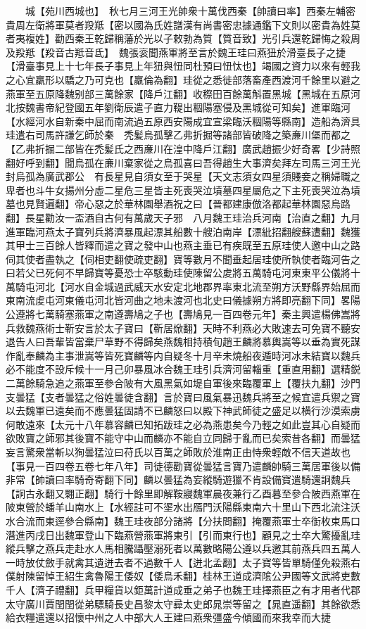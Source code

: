 　　城【苑川西城也】　秋七月三河王光帥衆十萬伐西秦【帥讀曰率】西秦左輔密貴周左衛將軍莫者羖羝【密以國為氏姓譜漢有尚書密忠據通鑑下文則以密貴為姓莫者夷複姓】勸西秦王乾歸稱藩於光以子敕勃為質【質音致】光引兵還乾歸悔之殺周及羖羝【羖音古羝音氐】　魏張衮聞燕軍將至言於魏王珪曰燕狃於滑臺長子之捷【滑臺事見上十七年長子事見上年狃與忸同杜預曰忸忲也】竭國之資力以來有輕我之心宜羸形以驕之乃可克也【羸倫為翻】珪從之悉徙部落畜產西渡河千餘里以避之燕軍至五原降魏别部三萬餘家【降戶江翻】收穄田百餘萬斛置黑城【黑城在五原河北按魏書帝紀登國五年劉衛辰遣子直力鞮出稒陽塞侵及黑城從可知矣】進軍臨河【水經河水自新秦中屈而南流過五原西安陽成宜宣梁臨沃稒陽等縣南】造船為濟具珪遣右司馬許謙乞師於秦　秃髪烏孤擊乙弗折掘等諸部皆破降之築亷川堡而都之【乙弗折掘二部皆在禿髪氏之西亷川在湟中降戶江翻】廣武趙振少好奇畧【少詩照翻好呼到翻】聞烏孤在亷川棄家從之烏孤喜曰吾得趙生大事濟矣拜左司馬三河王光封烏孤為廣武郡公　有長星見自須女至于哭星【天文志須女四星須賤妾之稱婦職之卑者也斗牛女揚州分虛二星危三星皆主死喪哭泣墳墓四星屬危之下主死喪哭泣為墳墓也見賢遍翻】帝心惡之於華林園舉酒祝之曰【晉都建康倣洛都起華林園惡烏路翻】長星勸汝一盃酒自古何有萬歲天子邪　八月魏王珪治兵河南【治直之翻】九月進軍臨河燕太子寶列兵將濟暴風起漂其船數十艘泊南岸【漂紕招翻艘蘇遭翻】魏獲其甲士三百餘人皆釋而遣之寶之發中山也燕主垂已有疾既至五原珪使人邀中山之路伺其使者盡執之【伺相吏翻使疏吏翻】寶等數月不聞垂起居珪使所執使者臨河告之曰若父已死何不早歸寶等憂恐士卒駭動珪使陳留公䖍將五萬騎屯河東東平公儀將十萬騎屯河北【河水自金城過武威天水安定北地郡界率東北流至朔方沃野縣界始屈而東南流䖍屯河東儀屯河北皆河曲之地未渡河也北史曰儀據朔方將即亮翻下同】畧陽公遵將七萬騎塞燕軍之南遵壽鳩之子也【壽鳩見一百四卷元年】秦主興遣楊佛嵩將兵救魏燕術士靳安言於太子寶曰【靳居焮翻】天時不利燕必大敗速去可免寶不聽安退告人曰吾輩皆當棄尸草野不得歸矣燕魏相持積旬趙王麟將慕輿嵩等以垂為實死謀作亂奉麟為主事泄嵩等皆死寶麟等内自疑冬十月辛未燒船夜遁時河冰未結寶以魏兵必不能度不設斥候十一月己卯暴風冰合魏王珪引兵濟河留輜重【重直用翻】選精鋭二萬餘騎急追之燕軍至參合陂有大風黑氣如堤自軍後來臨覆軍上【覆扶九翻】沙門支曇猛【支者曇猛之俗姓曇徒含翻】言於寶曰風氣暴迅魏兵將至之候宜遣兵禦之寶以去魏軍已遠矣而不應曇猛固請不已麟怒曰以殿下神武師徒之盛足以横行沙漠索虜何敢遠來【太元十八年慕容麟已知拓跋珪之必為燕患矣今乃輕之如此豈其心自疑而欲敗寶之師邪其後寶不能守中山而麟亦不能自立同歸于亂而已矣索昔各翻】而曇猛妄言驚衆當斬以狥曇猛泣曰苻氏以百萬之師敗於淮南正由恃衆輕敵不信天道故也【事見一百四卷五卷七年八年】司徒德勸寶從曇猛言寶乃遣麟帥騎三萬居軍後以備非常【帥讀曰率騎奇寄翻下同】麟以曇猛為妄縱騎遊獵不肯設備寶遣騎還詗魏兵【詗古永翻又翾正翻】騎行十餘里即解鞍寢魏軍晨夜兼行乙酉暮至參合陂西燕軍在陂東營於蟠羊山南水上【水經註可不埿水出鴈門沃陽縣東南六十里山下西北流注沃水合流而東逕參合縣南】魏王珪夜部分諸將【分扶問翻】掩覆燕軍士卒衘枚束馬口潛進丙戌日出魏軍登山下臨燕營燕軍將東引【引而東行也】顧見之士卒大驚擾亂珪縱兵擊之燕兵走赴水人馬相騰躡壓溺死者以萬數略陽公遵以兵邀其前燕兵四五萬人一時放仗斂手就禽其遺迸去者不過數千人【迸北孟翻】太子寶等皆單騎僅免殺燕右僕射陳留悼王紹生禽魯陽王倭奴【倭烏禾翻】桂林王道成濟隂公尹國等文武將吏數千人【濟子禮翻】兵甲糧貨以鉅萬計道成垂之弟子也魏王珪擇燕臣之有才用者代郡太守廣川賈閏閏從弟驃騎長史昌黎太守彛太史郎晁崇等留之【晁直遥翻】其餘欲悉給衣糧遣還以招懷中州之人中部大人王建曰燕衆彊盛今傾國而來我幸而大捷